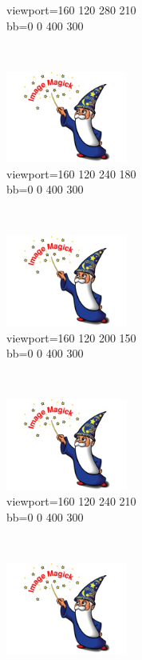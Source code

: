 \begin{figure}[h]
\begin{subfigure}[b]{0.3\textwidth}
        \caption{viewport=160 120 280 210\\bb=0 0 400 300}%
        \label{essai_d}
    \end{subfigure}
    ~
    \begin{subfigure}[b]{0.3\textwidth}
        \includegraphics[viewport=160 120 240 180,bb=0 0 400 300,width=4cm,height=3cm,clip=true]{test.jpg}
        \caption{viewport=160 120 240 180\\bb=0 0 400 300}%
        \label{essai_e}
    \end{subfigure}
    ~
    \begin{subfigure}[b]{0.3\textwidth}
        \includegraphics[viewport=160 120 200 150,bb=0 0 400 300,width=4cm,height=3cm,clip=true]{test.jpg}
        \caption{viewport=160 120 200 150\\bb=0 0 400 300}%
        \label{essai_f}
    \end{subfigure}
    \\
    \begin{subfigure}[b]{0.3\textwidth}
        \includegraphics[viewport=160 120 240 210,bb=0 0 400 300,width=4cm,height=3cm,clip=true]{test.jpg}
        \caption{viewport=160 120 240 210\\bb=0 0 400 300}%
        \label{essai_g}
    \end{subfigure}
    ~
    \begin{subfigure}[b]{0.3\textwidth}
        \includegraphics[viewport=160 120 240 180,bb=0 0 400 300,width=4cm,height=3cm,clip=true]{test.jpg}

\end{subfigure}
\end{figure}
